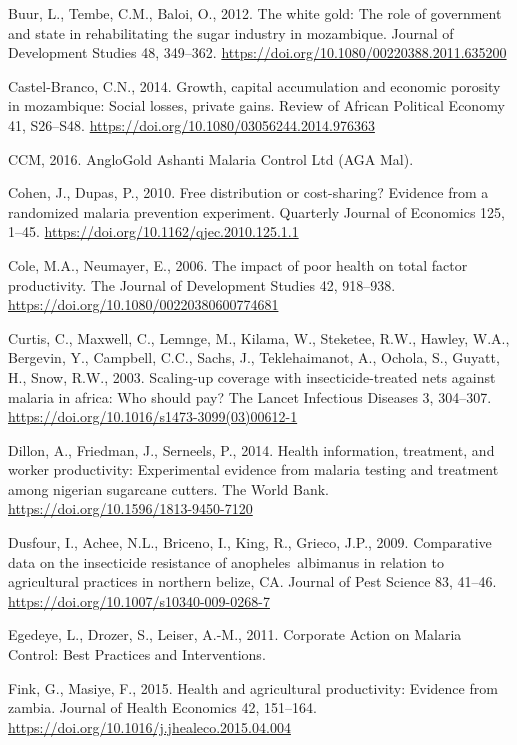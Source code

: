 \documentclass[]{article}
\begin{document}
\hypertarget{ref-Buur2012}{}
Buur, L., Tembe, C.M., Baloi, O., 2012. The white gold: The role of
government and state in rehabilitating the sugar industry in mozambique.
Journal of Development Studies 48, 349--362.
\url{https://doi.org/10.1080/00220388.2011.635200}

\hypertarget{ref-CastelBranco2014}{}
Castel-Branco, C.N., 2014. Growth, capital accumulation and economic
porosity in mozambique: Social losses, private gains. Review of African
Political Economy 41, S26--S48.
\url{https://doi.org/10.1080/03056244.2014.976363}

\hypertarget{ref-anglo}{}
CCM, 2016. AngloGold Ashanti Malaria Control Ltd (AGA Mal).

\hypertarget{ref-Cohen2010}{}
Cohen, J., Dupas, P., 2010. Free distribution or cost-sharing? Evidence
from a randomized malaria prevention experiment. Quarterly Journal of
Economics 125, 1--45. \url{https://doi.org/10.1162/qjec.2010.125.1.1}

\hypertarget{ref-Cole2006}{}
Cole, M.A., Neumayer, E., 2006. The impact of poor health on total
factor productivity. The Journal of Development Studies 42, 918--938.
\url{https://doi.org/10.1080/00220380600774681}

\hypertarget{ref-Curtis2003}{}
Curtis, C., Maxwell, C., Lemnge, M., Kilama, W., Steketee, R.W., Hawley,
W.A., Bergevin, Y., Campbell, C.C., Sachs, J., Teklehaimanot, A.,
Ochola, S., Guyatt, H., Snow, R.W., 2003. Scaling-up coverage with
insecticide-treated nets against malaria in africa: Who should pay? The
Lancet Infectious Diseases 3, 304--307.
\url{https://doi.org/10.1016/s1473-3099(03)00612-1}

\hypertarget{ref-Dillon2014}{}
Dillon, A., Friedman, J., Serneels, P., 2014. Health information,
treatment, and worker productivity: Experimental evidence from malaria
testing and treatment among nigerian sugarcane cutters. The World Bank.
\url{https://doi.org/10.1596/1813-9450-7120}

\hypertarget{ref-Dusfour2009}{}
Dusfour, I., Achee, N.L., Briceno, I., King, R., Grieco, J.P., 2009.
Comparative data on the insecticide resistance of anopheles~albimanus in
relation to agricultural practices in northern belize, CA. Journal of
Pest Science 83, 41--46. \url{https://doi.org/10.1007/s10340-009-0268-7}

\hypertarget{ref-lafarge}{}
Egedeye, L., Drozer, S., Leiser, A.-M., 2011. Corporate Action on
Malaria Control: Best Practices and Interventions.

\hypertarget{ref-Fink2015}{}
Fink, G., Masiye, F., 2015. Health and agricultural productivity:
Evidence from zambia. Journal of Health Economics 42, 151--164.
\url{https://doi.org/10.1016/j.jhealeco.2015.04.004}
\end{document}
